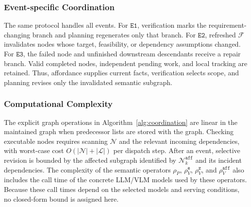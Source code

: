 \subsubsection{Event-specific Coordination}
\label{sec:event_specific_algorithm}

The same protocol handles all events. For $\texttt{E1}$, verification marks the
requirement-changing branch and planning regenerates only that branch. For
$\texttt{E2}$, refreshed $\mathcal{F}$ invalidates nodes whose target,
feasibility, or dependency assumptions changed. For $\texttt{E3}$, the failed
node and unfinished downstream descendants receive a  repair
branch. Valid completed nodes, independent pending work, and local tracking are
retained. Thus, affordance supplies current facts, verification selects scope,
and planning revises only the invalidated semantic subgraph.

\subsubsection{Computational Complexity}

The explicit graph operations in Algorithm~\ref{alg:coordination} are linear
in the maintained graph when predecessor lists are stored with the graph.
Checking executable nodes requires scanning $\mathcal{N}$ and the relevant
incoming dependencies, with worst-case cost $O(|\mathcal{N}|+|\mathcal{L}|)$ per
dispatch step. After an event, selective revision is bounded by the affected
subgraph identified by $\mathcal{N}_k^{\texttt{aff}}$ and its incident
dependencies. The complexity of the semantic operators
$\rho_P$, $\rho_V^{\texttt{e}}$,
$\rho_V^{\texttt{z}}$, and $\rho_V^{\texttt{aff}}$ also includes the call time
of the concrete LLM/VLM models used by these operators. Because these call
times depend on the selected models and serving conditions, no closed-form
bound is assigned here.
